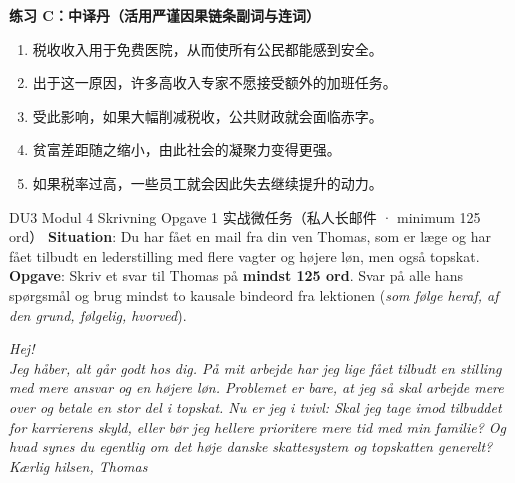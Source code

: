 \textbf{练习 C：中译丹（活用严谨因果链条副词与连词）}
\begin{enumerate}
  \item 税收收入用于免费医院，从而使所有公民都能感到安全。
  \item 出于这一原因，许多高收入专家不愿接受额外的加班任务。
  \item 受此影响，如果大幅削减税收，公共财政就会面临赤字。
  \item 贫富差距随之缩小，由此社会的凝聚力变得更强。
  \item 如果税率过高，一些员工就会因此失去继续提升的动力。
\end{enumerate}


\begin{emailbox}{DU3 Modul 4 Skrivning Opgave 1 实战微任务（私人长邮件 · minimum 125 ord）}
\textbf{Situation}: Du har fået en mail fra din ven Thomas, som er læge og har fået tilbudt en lederstilling med flere vagter og højere løn, men også topskat.\\
\textbf{Opgave}: Skriv et svar til Thomas på \textbf{mindst 125 ord}. Svar på alle hans spørgsmål og brug mindst to kausale bindeord fra lektionen (\textit{som følge heraf, af den grund, følgelig, hvorved}).

\vspace{0.3em}
\textit{Hej!\\
Jeg håber, alt går godt hos dig. På mit arbejde har jeg lige fået tilbudt en stilling med mere ansvar og en højere løn. Problemet er bare, at jeg så skal arbejde mere over og betale en stor del i topskat. Nu er jeg i tvivl: Skal jeg tage imod tilbuddet for karrierens skyld, eller bør jeg hellere prioritere mere tid med min familie? Og hvad synes du egentlig om det høje danske skattesystem og topskatten generelt?\\
Kærlig hilsen, Thomas}
\end{emailbox}


